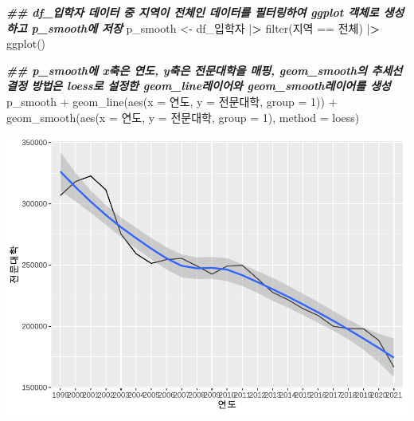 \documentclass[
]{article}
\newenvironment{Shaded}{\begin{snugshade}}{\end{snugshade}}
\newcommand{\AttributeTok}[1]{\textcolor[rgb]{0.77,0.63,0.00}{#1}}
\newcommand{\DecValTok}[1]{\textcolor[rgb]{0.00,0.00,0.81}{#1}}
\newcommand{\DocumentationTok}[1]{\textcolor[rgb]{0.56,0.35,0.01}{\textbf{\textit{#1}}}}
\newcommand{\ErrorTok}[1]{\textcolor[rgb]{0.64,0.00,0.00}{\textbf{#1}}}
\newcommand{\FunctionTok}[1]{\textcolor[rgb]{0.00,0.00,0.00}{#1}}
\newcommand{\NormalTok}[1]{#1}
\newcommand{\OtherTok}[1]{\textcolor[rgb]{0.56,0.35,0.01}{#1}}
\newcommand{\SpecialCharTok}[1]{\textcolor[rgb]{0.00,0.00,0.00}{#1}}
\newcommand{\StringTok}[1]{\textcolor[rgb]{0.31,0.60,0.02}{#1}}
\begin{document}
\begin{Shaded}
\begin{Highlighting}[]
\DocumentationTok{\#\#  df\_입학자 데이터 중 지역이 전체인 데이터를 필터링하여 ggplot 객체로 생성하고 p\_smooth에 저장}
\NormalTok{p\_smooth }\OtherTok{\textless{}{-}}\NormalTok{ df\_입학자 }\SpecialCharTok{|}\ErrorTok{\textgreater{}} \FunctionTok{filter}\NormalTok{(지역 }\SpecialCharTok{==} \StringTok{\textquotesingle{}전체\textquotesingle{}}\NormalTok{) }\SpecialCharTok{|}\ErrorTok{\textgreater{}}
  \FunctionTok{ggplot}\NormalTok{()}

\DocumentationTok{\#\#  p\_smooth에 x축은 연도, y축은 전문대학을 매핑, geom\_smooth의 추세선 결정 방법은 \textquotesingle{}loess\textquotesingle{}로 설정한 geom\_line레이어와 geom\_smooth레이어를 생성}
\NormalTok{p\_smooth }\SpecialCharTok{+}
  \FunctionTok{geom\_line}\NormalTok{(}\FunctionTok{aes}\NormalTok{(}\AttributeTok{x =}\NormalTok{ 연도, }\AttributeTok{y =}\NormalTok{ 전문대학, }\AttributeTok{group =} \DecValTok{1}\NormalTok{)) }\SpecialCharTok{+}
  \FunctionTok{geom\_smooth}\NormalTok{(}\FunctionTok{aes}\NormalTok{(}\AttributeTok{x =}\NormalTok{ 연도, }\AttributeTok{y =}\NormalTok{ 전문대학, }\AttributeTok{group =} \DecValTok{1}\NormalTok{), }\AttributeTok{method =} \StringTok{\textquotesingle{}loess\textquotesingle{}}\NormalTok{)}
\end{Highlighting}
\end{Shaded}

\includegraphics{chap3_files/figure-latex/unnamed-chunk-34-1.pdf}
\end{document}

